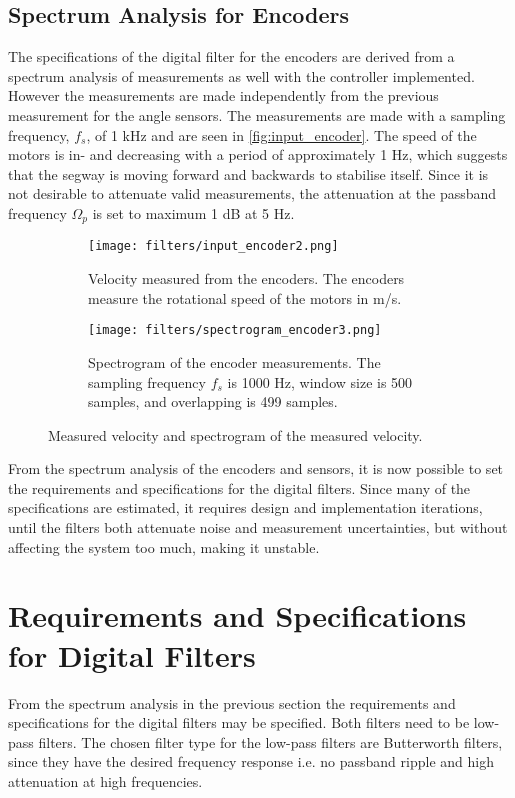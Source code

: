\subsection{Spectrum Analysis for Encoders}
The specifications of the digital filter for the encoders are derived from a spectrum analysis of measurements as well with the controller implemented. However the measurements are made independently from the previous measurement for the angle sensors. The measurements are made with a sampling frequency, $f_s$, of 1 kHz and are seen in \autoref{fig:input_encoder}. The speed of the motors is in- and decreasing with a period of approximately 1 Hz, which suggests that the segway is moving forward and backwards to stabilise itself. Since it is not desirable to attenuate valid measurements, the attenuation at the passband frequency $\Omega_p$ is set to maximum 1 dB at 5 Hz.
\begin{figure}[H]
\centering
\begin{subfigure}[b]{0.95\textwidth}
\hspace*{-0.6cm} 
    \texttt{[image: filters/input\_encoder2.png]}
    \caption{Velocity measured from the encoders. The encoders measure the rotational speed of the motors in m/s.}
    \label{fig:input_encoder}
\end{subfigure}    
\begin{subfigure}[b]{0.98\textwidth}
    \texttt{[image: filters/spectrogram\_encoder3.png]}
    \caption{Spectrogram of the encoder measurements. The sampling frequency $f_s$ is 1000 Hz, window size is 500 samples, and overlapping is 499 samples.}
    \label{fig:spectrogram_encoder}
\end{subfigure}   
\caption{Measured velocity and spectrogram of the measured velocity.}
\end{figure}

From the spectrum analysis of the encoders and sensors, it is now possible to set the requirements and specifications for the digital filters. Since many of the specifications are estimated, it requires design and implementation iterations, until the filters both attenuate noise and measurement uncertainties, but without affecting the system too much, making it unstable.
\section{Requirements and Specifications for Digital Filters}
From the spectrum analysis in the previous section the requirements and specifications for the digital filters may be specified. Both filters need to be low-pass filters. The chosen filter type for the low-pass filters are Butterworth filters, since they have the desired frequency response i.e. no passband ripple and high attenuation at high frequencies. 

